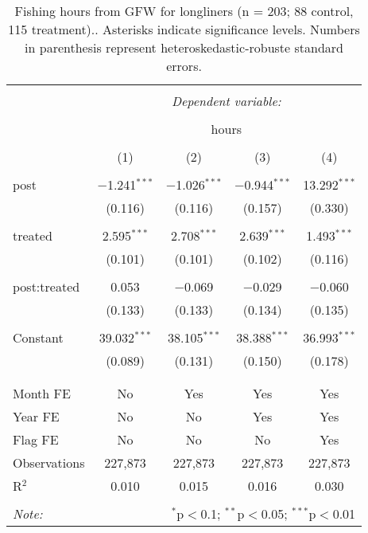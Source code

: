 \documentclass[11pt,]{article}
\begin{document}
\begin{table}[!htbp] \centering 
  \caption{\label{tab:long}Fishing hours from GFW for longliners (n = 203; 88 control, 115 treatment).. Asterisks indicate significance levels. Numbers in parenthesis represent heteroskedastic-robuste standard errors.} 
  \label{} 
\begin{tabular}{@{\extracolsep{5pt}}lcccc} 
\\[-1.8ex]\hline 
\hline \\[-1.8ex] 
 & \multicolumn{4}{c}{\textit{Dependent variable:}} \\ 
\cline{2-5} 
\\[-1.8ex] & \multicolumn{4}{c}{hours} \\ 
\\[-1.8ex] & (1) & (2) & (3) & (4)\\ 
\hline \\[-1.8ex] 
 post & $-$1.241$^{***}$ & $-$1.026$^{***}$ & $-$0.944$^{***}$ & 13.292$^{***}$ \\ 
  & (0.116) & (0.116) & (0.157) & (0.330) \\ 
  & & & & \\ 
 treated & 2.595$^{***}$ & 2.708$^{***}$ & 2.639$^{***}$ & 1.493$^{***}$ \\ 
  & (0.101) & (0.101) & (0.102) & (0.116) \\ 
  & & & & \\ 
 post:treated & 0.053 & $-$0.069 & $-$0.029 & $-$0.060 \\ 
  & (0.133) & (0.133) & (0.134) & (0.135) \\ 
  & & & & \\ 
 Constant & 39.032$^{***}$ & 38.105$^{***}$ & 38.388$^{***}$ & 36.993$^{***}$ \\ 
  & (0.089) & (0.131) & (0.150) & (0.178) \\ 
  & & & & \\ 
\hline \\[-1.8ex] 
Month FE & No & Yes & Yes & Yes \\ 
Year FE & No & No & Yes & Yes \\ 
Flag FE & No & No & No & Yes \\ 
Observations & 227,873 & 227,873 & 227,873 & 227,873 \\ 
R$^{2}$ & 0.010 & 0.015 & 0.016 & 0.030 \\ 
\hline 
\hline \\[-1.8ex] 
\textit{Note:}  & \multicolumn{4}{r}{$^{*}$p$<$0.1; $^{**}$p$<$0.05; $^{***}$p$<$0.01} \\ 
\end{tabular} 
\end{table}
\end{document}

